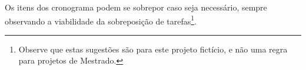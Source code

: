 \documentclass[a4paper]{article}
\begin{document}
Os itens dos cronograma podem se sobrepor caso seja necessário, sempre
observando a viabilidade da sobreposição de tarefas\footnote{Observe
  que estas sugestões são para este projeto fictício, e não uma regra
  para projetos de Mestrado.}.


\end{document}
